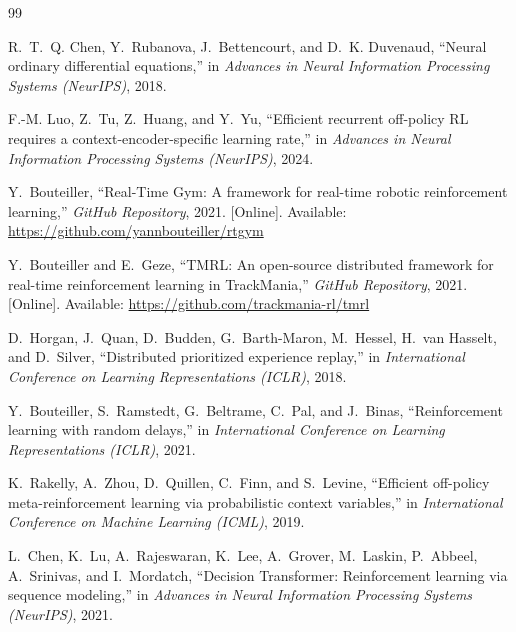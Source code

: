 \documentclass[conference]{IEEEtran}
\begin{document}
\begin{thebibliography}{99}

R.~T.~Q. Chen, Y.~Rubanova, J.~Bettencourt, and D.~K. Duvenaud, ``Neural ordinary differential equations,'' in \emph{Advances in Neural Information Processing Systems (NeurIPS)}, 2018.




F.-M. Luo, Z.~Tu, Z.~Huang, and Y.~Yu, ``Efficient recurrent off-policy RL requires a context-encoder-specific learning rate,'' in \emph{Advances in Neural Information Processing Systems (NeurIPS)}, 2024.




Y.~Bouteiller, ``Real-Time Gym: A framework for real-time robotic reinforcement learning,'' \emph{GitHub Repository}, 2021. [Online]. Available: \url{https://github.com/yannbouteiller/rtgym}




Y.~Bouteiller and E.~Geze, ``TMRL: An open-source distributed framework for real-time reinforcement learning in TrackMania,'' \emph{GitHub Repository}, 2021. [Online]. Available: \url{https://github.com/trackmania-rl/tmrl}




D.~Horgan, J.~Quan, D.~Budden, G.~Barth-Maron, M.~Hessel, H.~van Hasselt, and D.~Silver, ``Distributed prioritized experience replay,'' in \emph{International Conference on Learning Representations (ICLR)}, 2018.




Y.~Bouteiller, S.~Ramstedt, G.~Beltrame, C.~Pal, and J.~Binas, ``Reinforcement learning with random delays,'' in \emph{International Conference on Learning Representations (ICLR)}, 2021.




K.~Rakelly, A.~Zhou, D.~Quillen, C.~Finn, and S.~Levine, ``Efficient off-policy meta-reinforcement learning via probabilistic context variables,'' in \emph{International Conference on Machine Learning (ICML)}, 2019.




L.~Chen, K.~Lu, A.~Rajeswaran, K.~Lee, A.~Grover, M.~Laskin, P.~Abbeel, A.~Srinivas, and I.~Mordatch, ``Decision Transformer: Reinforcement learning via sequence modeling,'' in \emph{Advances in Neural Information Processing Systems (NeurIPS)}, 2021.




\end{thebibliography}
\end{document}
